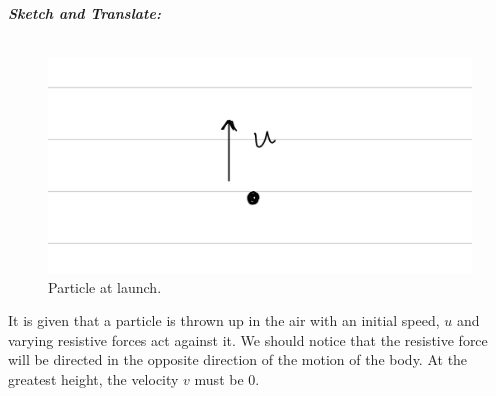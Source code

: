 \begin{subquestions}
\textbf{\textit{Sketch and Translate:}} \\ \\
\begin{figure}[H]
	\begin{center}
		\includegraphics[scale=0.25]{../2007/figures/2008Mq6Sketch}
		\caption{\label{2008M:q6:Sketch1} Particle at launch.}
	\end{center}
\end{figure}
It is given that a particle is thrown up in the air with an initial speed, $u$ and varying resistive forces act against it. We should notice that the resistive force will be directed in the opposite direction of the motion of the body. At the greatest height, the velocity $v$ must be 0.





\end{subquestions}
